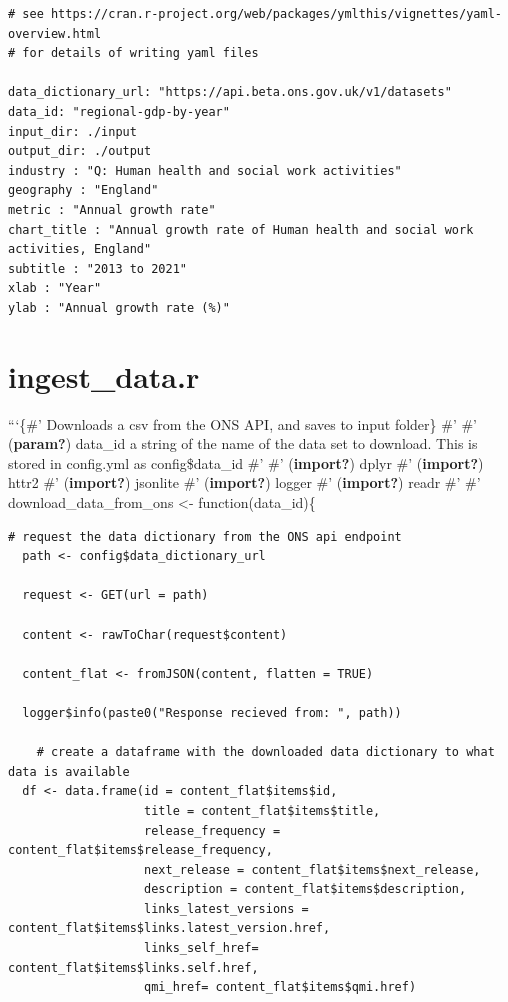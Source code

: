 \documentclass[
  letterpaper,
]{book}
\begin{document}
\begin{verbatim}
# see https://cran.r-project.org/web/packages/ymlthis/vignettes/yaml-overview.html
# for details of writing yaml files

data_dictionary_url: "https://api.beta.ons.gov.uk/v1/datasets"
data_id: "regional-gdp-by-year"
input_dir: ./input
output_dir: ./output
industry : "Q: Human health and social work activities"
geography : "England"
metric : "Annual growth rate"
chart_title : "Annual growth rate of Human health and social work activities, England"
subtitle : "2013 to 2021"
xlab : "Year"
ylab : "Annual growth rate (%)"
\end{verbatim}


\hypertarget{ingest_data.r}{%
\chapter{ingest\_data.r}\label{ingest_data.r}}

```\{\#' Downloads a csv from the ONS API, and saves to input folder\}
\#' \#' (\textbf{param?}) data\_id a string of the name of the data set
to download. This is stored in config.yml as config\$data\_id \#' \#'
(\textbf{import?}) dplyr \#' (\textbf{import?}) httr2 \#'
(\textbf{import?}) jsonlite \#' (\textbf{import?}) logger \#'
(\textbf{import?}) readr \#' \#' download\_data\_from\_ons \textless-
function(data\_id)\{

\begin{verbatim}
# request the data dictionary from the ONS api endpoint
  path <- config$data_dictionary_url

  request <- GET(url = path)
        
  content <- rawToChar(request$content)
      
  content_flat <- fromJSON(content, flatten = TRUE) 
        
  logger$info(paste0("Response recieved from: ", path))
        
    # create a dataframe with the downloaded data dictionary to what data is available
  df <- data.frame(id = content_flat$items$id,
                   title = content_flat$items$title,
                   release_frequency = content_flat$items$release_frequency,
                   next_release = content_flat$items$next_release,
                   description = content_flat$items$description,
                   links_latest_versions = content_flat$items$links.latest_version.href,
                   links_self_href= content_flat$items$links.self.href,
                   qmi_href= content_flat$items$qmi.href)
  
  
\end{verbatim}
\end{document}

